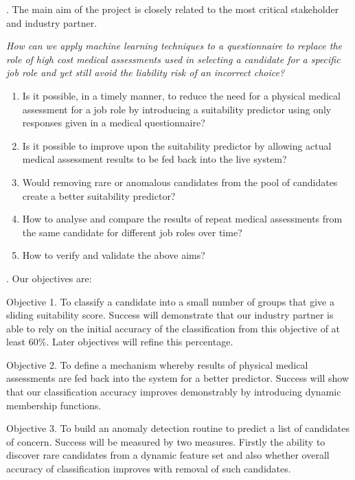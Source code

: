 \documentclass{ruthesis}
\begin{document}
. The main aim of the project is closely related to the most critical stakeholder and industry partner.


\textit{How can we apply machine learning techniques to a questionnaire to replace the role of high cost medical assessments used in selecting a candidate for a specific job role and yet still avoid the liability risk of an incorrect choice?}

\begin{enumerate} [label=Question \arabic*:, leftmargin=*]
	\item Is it possible, in a timely manner, to reduce the need for a physical medical assessment for a job role by introducing a suitability predictor using only responses given in a medical questionnaire?

	\item Is it possible to improve upon the suitability predictor by allowing actual medical assessment results to be fed back into the live system?

	\item Would removing rare or anomalous candidates from the pool of candidates create a better suitability predictor?

	\item How to analyse and compare the results of repeat medical assessments from the same candidate for different job roles over time?

	\item How to verify and validate the above aims?
\end{enumerate}

. Our objectives are:

Objective 1. To classify a candidate into a small number of groups that give a sliding suitability score. Success will demonstrate that our industry partner is able to rely on the initial accuracy of the classification from this objective of at least 60\%. Later objectives will refine this percentage.

Objective 2. To define a mechanism whereby results of physical medical assessments are fed back into the system for a better predictor. Success will show that our classification accuracy improves demonstrably by introducing dynamic membership functions.

Objective 3. To build an anomaly detection routine to predict a list of candidates of concern. Success will be measured by two measures. Firstly the ability to discover rare candidates from a dynamic feature set and also whether overall accuracy of classification improves with removal of such candidates.
\end{document}
